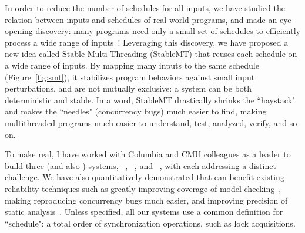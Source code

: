 In order to reduce the number of schedules for all inputs, we have studied the relation between inputs and schedules of real-world programs, and made an eye-opening discovery: many programs need only a small set of schedules to efficiently process a wide range of inputs~\cite{smt:cacm}! Leveraging this discovery, we have proposed a new idea called Stable Multi-Threading (StableMT) that reuses each schedule on a wide range of inputs. By mapping many inputs to the same schedule (Figure~\ref{fig:smt}), it stabilizes program behaviors against small input perturbations. \smt and \dmt are not mutually exclusive: a system can be both deterministic and stable. In a word, StableMT drastically shrinks the ``haystack" and makes the ``needles" (concurrency bugs) much easier to find, making multithreaded programs much easier to understand, test, analyzed, verify, and so on.


To make \smt real, I have worked with Columbia and CMU colleagues as a leader to build three \smt (and also \dmt) systems, \tern~\cite{cui:tern:osdi10}, \peregrine~\cite{peregrine:sosp11}, and \parrot~\cite{parrot:sosp13}, with each addressing a distinct challenge. We have also quantitatively demonstrated that \smt can benefit existing reliability techniques such as greatly improving coverage of model checking~\cite{parrot:sosp13}, making reproducing concurrency bugs much easier, and improving precision of static analysis~\cite{wu:pldi12}. Unless specified, all our systems use a common definition for ``schedule": a total order of synchronization operations, such as lock acquisitions.

